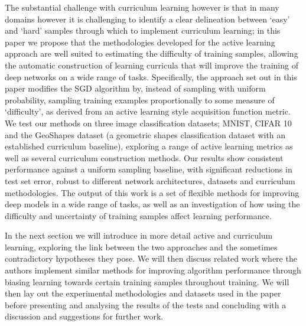 The substantial challenge with curriculum learning however is that in many domains however it is challenging to identify a clear delineation between `easy' and `hard' samples through which to implement curriculum learning; in this paper we propose that the methodologies developed for the active learning approach are well suited to estimating the difficulty of training samples, allowing the automatic construction of learning curricula that will improve the training of deep networks on a wide range of tasks. Specifically, the approach set out in this paper modifies the SGD algorithm by, instead of sampling with uniform probability, sampling training examples proportionally to some measure of `difficulty', as derived from an active learning style acquisition function metric. We test our methods on three image classification datasets; MNIST, CIFAR 10 and the GeoShapes dataset (a geometric shapes classification dataset with an established curriculum baseline), exploring a range of active learning metrics as well as several curriculum construction methods. Our results show consistent performance against a uniform sampling baseline, with significant reductions in test set error, robust to different network architectures, datasets and curriculum methodologies. The output of this work is a set of flexible methods for improving deep models in a wide range of tasks, as well as an investigation of how using the difficulty and uncertainty of training samples affect learning performance. 

In the next section we will introduce in more detail active and curriculum learning, exploring the link between the two approaches and the sometimes contradictory hypotheses they pose. We will then discuss related work where the authors implement similar methods for improving algorithm performance through biasing learning towards certain training samples throughout training. We will then lay out the experimental methodologies and datasets used in the paper before presenting and analysing the results of the tests and concluding with a discussion and suggestions for further work.
